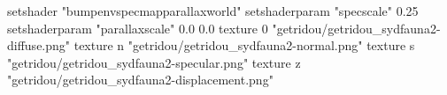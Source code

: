 setshader "bumpenvspecmapparallaxworld"
setshaderparam "specscale" 0.25
setshaderparam "parallaxscale" 0.0 0.0
texture 0 "getridou/getridou_sydfauna2-diffuse.png"
texture n "getridou/getridou_sydfauna2-normal.png"
texture s "getridou/getridou_sydfauna2-specular.png"
texture z "getridou/getridou_sydfauna2-displacement.png"
